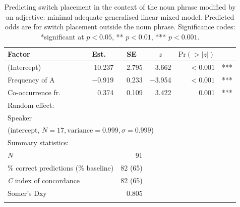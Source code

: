 \begin{table}
\begin{tabular}{l rrrr l}
		 \lsptoprule
            	Factor & \multicolumn{1}{c}{Est.} & \multicolumn{1}{c}{SE} & \multicolumn{1}{c}{$z$}  & \multicolumn{1}{c}{$\text{Pr}(>|z|)$} & \\\midrule
			(Intercept)  &10.237 &2.795 &3.662 &$<0.001$ &{***}\\
			Frequency of A &−0.919 &0.233 &−3.954  &$<0.001$ &{***}\\ 
			Co-occurrence fr. &0.374 &0.109   &3.422 &0.001 &{***}\\\midrule
			\multicolumn{6}{l}{Random effect:}\\
			\multicolumn{6}{l}{Speaker}\\
			\multicolumn{6}{l}{(intercept, $N = 17, \text{variance} = 0.999, \sigma = 0.999$)}\\
			\midrule 
			\multicolumn{6}{l}{Summary statistics:}\\
			\multicolumn{2}{l}{$N$} & 91\\
			\multicolumn{2}{l}{\% correct predictions (\% baseline)}  & 82 (65)\\
			\multicolumn{2}{l}{\textit{C} index of concordance}  & 82 (65)\\
			\multicolumn{2}{l}{Somer's Dxy}  & 0.805\\
			\lspbottomrule
		\end{tabular}
\caption{Predicting switch placement in the context of the noun phrase modified by an adjective: minimal adequate generalised linear mixed model. Predicted odds are for switch placement outside the noun phrase. Significance codes: *significant at $p<0.05$, ** $p<0.01$, *** $p < 0.001.$ \label{tab:4:12}}
\end{table}

